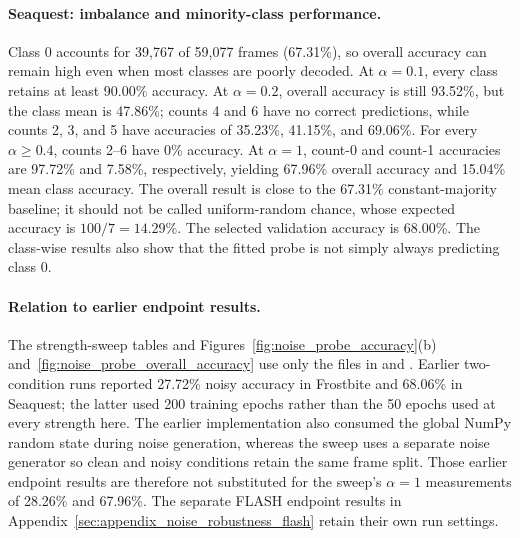 \documentclass{article} %
\begin{document}
\paragraph{Seaquest: imbalance and minority-class performance.}
Class 0 accounts for 39,767 of 59,077 frames (67.31\%), so overall accuracy can remain high even when most classes are poorly decoded. At $\alpha=0.1$, every class retains at least 90.00\% accuracy. At $\alpha=0.2$, overall accuracy is still 93.52\%, but the class mean is 47.86\%; counts 4 and 6 have no correct predictions, while counts 2, 3, and 5 have accuracies of 35.23\%, 41.15\%, and 69.06\%. For every $\alpha\geq0.4$, counts 2--6 have 0\% accuracy. At $\alpha=1$, count-0 and count-1 accuracies are 97.72\% and 7.58\%, respectively, yielding 67.96\% overall accuracy and 15.04\% mean class accuracy. The overall result is close to the 67.31\% constant-majority baseline; it should not be called uniform-random chance, whose expected accuracy is $100/7=14.29\%$. The selected validation accuracy is 68.00\%. The class-wise results also show that the fitted probe is not simply always predicting class 0.

\paragraph{Relation to earlier endpoint results.}
The strength-sweep tables and Figures~\ref{fig:noise_probe_accuracy}(b) and~\ref{fig:noise_probe_overall_accuracy} use only the files in  and . Earlier two-condition runs reported 27.72\% noisy accuracy in Frostbite and 68.06\% in Seaquest; the latter used 200 training epochs rather than the 50 epochs used at every strength here. The earlier implementation also consumed the global NumPy random state during noise generation, whereas the sweep uses a separate noise generator so clean and noisy conditions retain the same frame split. Those earlier endpoint results are therefore not substituted for the sweep's $\alpha=1$ measurements of 28.26\% and 67.96\%. The separate FLASH endpoint results in Appendix~\ref{sec:appendix_noise_robustness_flash} retain their own run settings.
\end{document}
